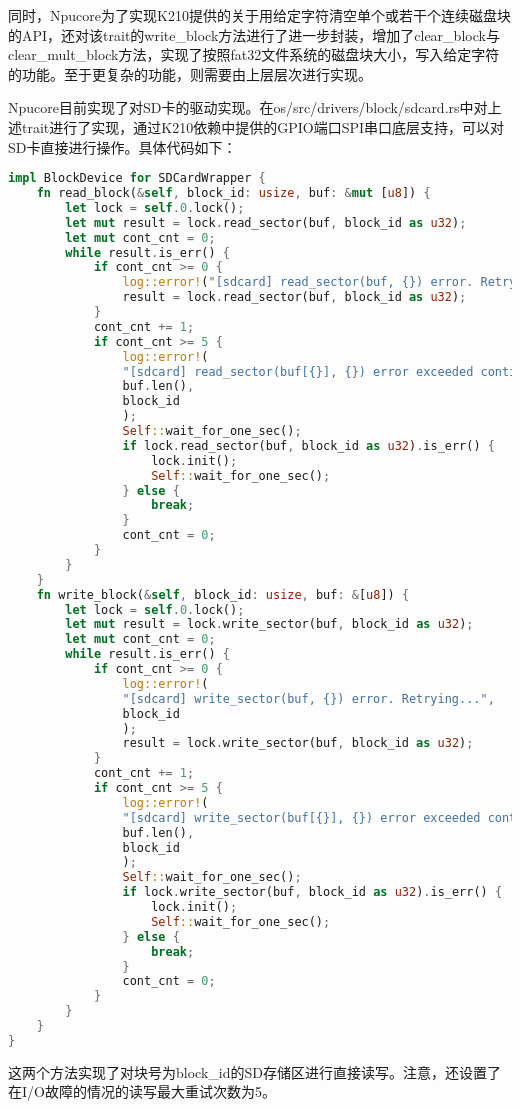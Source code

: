 同时，Npucore为了实现K210提供的关于用给定字符清空单个或若干个连续磁盘块的API，还对该trait的write\_block方法进行了进一步封装，增加了clear\_block与clear\_mult\_block方法，实现了按照fat32文件系统的磁盘块大小，写入给定字符的功能。至于更复杂的功能，则需要由上层层次进行实现。

Npucore目前实现了对SD卡的驱动实现。在os/src/drivers/block/sdcard.rs中对上述trait进行了实现，通过K210依赖中提供的GPIO端口SPI串口底层支持，可以对SD卡直接进行操作。具体代码如下：

\begin{lstlisting}[language={Rust}, label={code:blockdevice},
	caption={os/src/drivers/block/sdcard.rs}]
impl BlockDevice for SDCardWrapper {
	fn read_block(&self, block_id: usize, buf: &mut [u8]) {
		let lock = self.0.lock();
		let mut result = lock.read_sector(buf, block_id as u32);
		let mut cont_cnt = 0;
		while result.is_err() {
			if cont_cnt >= 0 {
				log::error!("[sdcard] read_sector(buf, {}) error. Retrying...", block_id);
				result = lock.read_sector(buf, block_id as u32);
			}
			cont_cnt += 1;
			if cont_cnt >= 5 {
				log::error!(
				"[sdcard] read_sector(buf[{}], {}) error exceeded contineous retry count, waiting...",
				buf.len(),
				block_id
				);
				Self::wait_for_one_sec();
				if lock.read_sector(buf, block_id as u32).is_err() {
					lock.init();
					Self::wait_for_one_sec();
				} else {
					break;
				}
				cont_cnt = 0;
			}
		}
	}
	fn write_block(&self, block_id: usize, buf: &[u8]) {
		let lock = self.0.lock();
		let mut result = lock.write_sector(buf, block_id as u32);
		let mut cont_cnt = 0;
		while result.is_err() {
			if cont_cnt >= 0 {
				log::error!(
				"[sdcard] write_sector(buf, {}) error. Retrying...",
				block_id
				);
				result = lock.write_sector(buf, block_id as u32);
			}
			cont_cnt += 1;
			if cont_cnt >= 5 {
				log::error!(
				"[sdcard] write_sector(buf[{}], {}) error exceeded contineous retry count, waiting...",
				buf.len(),
				block_id
				);
				Self::wait_for_one_sec();
				if lock.write_sector(buf, block_id as u32).is_err() {
					lock.init();
					Self::wait_for_one_sec();
				} else {
					break;
				}
				cont_cnt = 0;
			}
		}
	}
}
\end{lstlisting}

这两个方法实现了对块号为block\_id的SD存储区进行直接读写。注意，还设置了在I/O故障的情况的读写最大重试次数为5。